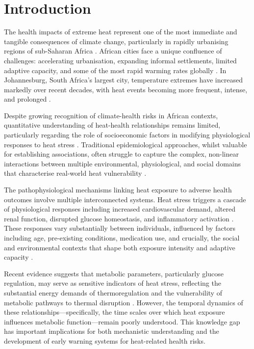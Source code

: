 \documentclass[11pt,a4paper]{article}
\begin{document}
\section{Introduction}

The health impacts of extreme heat represent one of the most immediate and tangible consequences of climate change, particularly in rapidly urbanising regions of sub-Saharan Africa \citep{Mora2017, Watts2021}. African cities face a unique confluence of challenges: accelerating urbanisation, expanding informal settlements, limited adaptive capacity, and some of the most rapid warming rates globally \citep{Engelbrecht2015, Vogel2019}. In Johannesburg, South Africa's largest city, temperature extremes have increased markedly over recent decades, with heat events becoming more frequent, intense, and prolonged \citep{Garland2015, MacLeod2021}.

Despite growing recognition of climate-health risks in African contexts, quantitative understanding of heat-health relationships remains limited, particularly regarding the role of socioeconomic factors in modifying physiological responses to heat stress \citep{Green2019, Chersich2018}. Traditional epidemiological approaches, whilst valuable for establishing associations, often struggle to capture the complex, non-linear interactions between multiple environmental, physiological, and social domains that characterise real-world heat vulnerability \citep{Gronlund2014, Benmarhnia2015}.

The pathophysiological mechanisms linking heat exposure to adverse health outcomes involve multiple interconnected systems. Heat stress triggers a cascade of physiological responses including increased cardiovascular demand, altered renal function, disrupted glucose homeostasis, and inflammatory activation \citep{Kenny2018, Periard2021}. These responses vary substantially between individuals, influenced by factors including age, pre-existing conditions, medication use, and crucially, the social and environmental contexts that shape both exposure intensity and adaptive capacity \citep{Kovats2008, Bunker2016}.

Recent evidence suggests that metabolic parameters, particularly glucose regulation, may serve as sensitive indicators of heat stress, reflecting the substantial energy demands of thermoregulation and the vulnerability of metabolic pathways to thermal disruption \citep{Lim2018, Westwood2021}. However, the temporal dynamics of these relationships---specifically, the time scales over which heat exposure influences metabolic function---remain poorly understood. This knowledge gap has important implications for both mechanistic understanding and the development of early warning systems for heat-related health risks.
\end{document}
